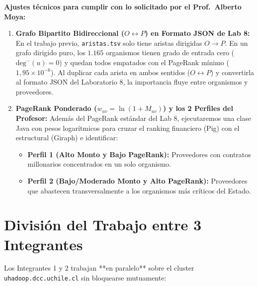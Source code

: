 \documentclass[10pt,letterpaper]{article}
\begin{document}
\vspace{0.15cm}
\noindent\textbf{Ajustes técnicos para cumplir con lo solicitado por el Prof.\ Alberto Moya:}
\begin{enumerate}[leftmargin=*, nosep]
    \item \textbf{Grafo Bipartito Bidireccional ($O \leftrightarrow P$) en Formato JSON de Lab 8:} En el trabajo previo, \texttt{aristas.tsv} solo tiene aristas dirigidas $O \to P$. En un grafo dirigido puro, los $1.165$ organismos tienen grado de entrada cero ($\text{deg}^-(u)=0$) y quedan todos empatados con el PageRank mínimo ($1,95 \times 10^{-6}$). Al duplicar cada arista en ambos sentidos ($O \leftrightarrow P$) y convertirla al formato JSON del Laboratorio 8, la importancia fluye entre organismos y proveedores.
    \item \textbf{PageRank Ponderado ($w_{uv} = \ln(1 + M_{uv})$) y los 2 Perfiles del Profesor:} Además del PageRank estándar del Lab 8, ejecutaremos una clase Java con pesos logarítmicos para cruzar el ranking financiero (Pig) con el estructural (Giraph) e identificar:
    \begin{itemize}[nosep]
        \item \textbf{Perfil 1 (Alto Monto y Bajo PageRank):} Proveedores con contratos millonarios concentrados en un solo organismo.
        \item \textbf{Perfil 2 (Bajo/Moderado Monto y Alto PageRank):} Proveedores que abastecen transversalmente a los organismos más críticos del Estado.
    \end{itemize}
\end{enumerate}

\section{División del Trabajo entre 3 Integrantes}

Los Integrantes 1 y 2 trabajan **en paralelo** sobre el cluster \texttt{uhadoop.dcc.uchile.cl} sin bloquearse mutuamente:
\end{document}
